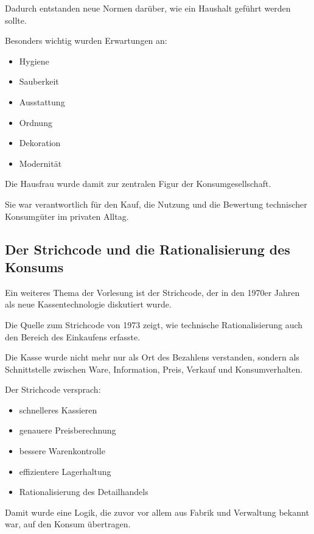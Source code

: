 Dadurch entstanden neue Normen darüber,
wie ein Haushalt geführt werden sollte.

Besonders wichtig wurden Erwartungen an:

\begin{itemize}
\item Hygiene
\item Sauberkeit
\item Ausstattung
\item Ordnung
\item Dekoration
\item Modernität
\end{itemize}

Die Hausfrau wurde damit zur zentralen Figur
der Konsumgesellschaft.

Sie war verantwortlich für den Kauf,
die Nutzung und die Bewertung technischer Konsumgüter
im privaten Alltag.


\subsection{Der Strichcode und die Rationalisierung des Konsums}

Ein weiteres Thema der Vorlesung ist der Strichcode,
der in den 1970er Jahren
als neue Kassentechnologie diskutiert wurde.

Die Quelle zum Strichcode von 1973 zeigt,
wie technische Rationalisierung
auch den Bereich des Einkaufens erfasste.

Die Kasse wurde nicht mehr nur als Ort des Bezahlens verstanden,
sondern als Schnittstelle zwischen Ware,
Information,
Preis,
Verkauf und Konsumverhalten.

Der Strichcode versprach:

\begin{itemize}
\item schnelleres Kassieren
\item genauere Preisberechnung
\item bessere Warenkontrolle
\item effizientere Lagerhaltung
\item Rationalisierung des Detailhandels
\end{itemize}

Damit wurde eine Logik,
die zuvor vor allem aus Fabrik und Verwaltung bekannt war,
auf den Konsum übertragen.

